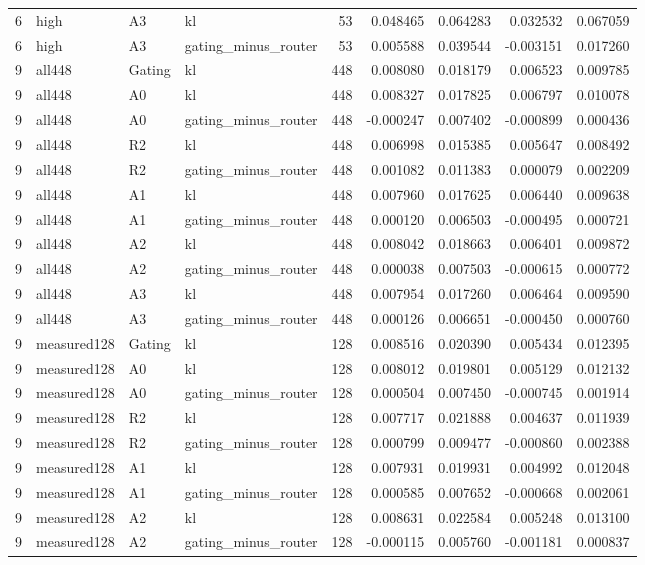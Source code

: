 \begin{tabular}{rlllrrrrr}
6 & high & A3 & kl & 53 & 0.048465 & 0.064283 & 0.032532 & 0.067059 \\
6 & high & A3 & gating_minus_router & 53 & 0.005588 & 0.039544 & -0.003151 & 0.017260 \\
9 & all448 & Gating & kl & 448 & 0.008080 & 0.018179 & 0.006523 & 0.009785 \\
9 & all448 & A0 & kl & 448 & 0.008327 & 0.017825 & 0.006797 & 0.010078 \\
9 & all448 & A0 & gating_minus_router & 448 & -0.000247 & 0.007402 & -0.000899 & 0.000436 \\
9 & all448 & R2 & kl & 448 & 0.006998 & 0.015385 & 0.005647 & 0.008492 \\
9 & all448 & R2 & gating_minus_router & 448 & 0.001082 & 0.011383 & 0.000079 & 0.002209 \\
9 & all448 & A1 & kl & 448 & 0.007960 & 0.017625 & 0.006440 & 0.009638 \\
9 & all448 & A1 & gating_minus_router & 448 & 0.000120 & 0.006503 & -0.000495 & 0.000721 \\
9 & all448 & A2 & kl & 448 & 0.008042 & 0.018663 & 0.006401 & 0.009872 \\
9 & all448 & A2 & gating_minus_router & 448 & 0.000038 & 0.007503 & -0.000615 & 0.000772 \\
9 & all448 & A3 & kl & 448 & 0.007954 & 0.017260 & 0.006464 & 0.009590 \\
9 & all448 & A3 & gating_minus_router & 448 & 0.000126 & 0.006651 & -0.000450 & 0.000760 \\
9 & measured128 & Gating & kl & 128 & 0.008516 & 0.020390 & 0.005434 & 0.012395 \\
9 & measured128 & A0 & kl & 128 & 0.008012 & 0.019801 & 0.005129 & 0.012132 \\
9 & measured128 & A0 & gating_minus_router & 128 & 0.000504 & 0.007450 & -0.000745 & 0.001914 \\
9 & measured128 & R2 & kl & 128 & 0.007717 & 0.021888 & 0.004637 & 0.011939 \\
9 & measured128 & R2 & gating_minus_router & 128 & 0.000799 & 0.009477 & -0.000860 & 0.002388 \\
9 & measured128 & A1 & kl & 128 & 0.007931 & 0.019931 & 0.004992 & 0.012048 \\
9 & measured128 & A1 & gating_minus_router & 128 & 0.000585 & 0.007652 & -0.000668 & 0.002061 \\
9 & measured128 & A2 & kl & 128 & 0.008631 & 0.022584 & 0.005248 & 0.013100 \\
9 & measured128 & A2 & gating_minus_router & 128 & -0.000115 & 0.005760 & -0.001181 & 0.000837 \\

\end{tabular}
